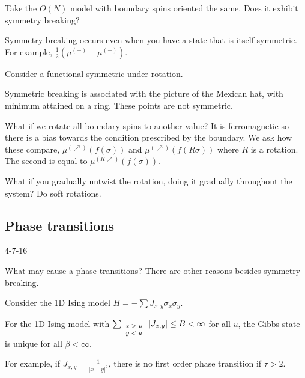 \documentclass[12pt]{book}
\theoremstyle{norm}
\begin{document}
Take the $O(N)$ model with boundary spins oriented the same. Does it exhibit symmetry breaking? %

Symmetry breaking occurs even when you have a state that is itself symmetric. For example, $\frac{1}{2} (\mu^{(+)} + \mu^{(-)})$. 

Consider a functional symmetric under rotation. 

Symmetric breaking is associated with the picture of the Mexican hat, with minimum attained on a ring. These points are not symmetric. 


What if we rotate all boundary spins to another value? It is ferromagnetic so there is a bias towards the condition prescribed by the boundary. %
We ask how these compare, $\mu^{(\nearrow)} (f(\sigma))$ and $\mu^{(\nearrow)} (f(R\sigma))$ where $R$ is a rotation. The second is equal to $\mu^{(R\nearrow)}(f(\sigma))$. 

What if you gradually untwist the rotation, doing it gradually throughout the system? Do soft rotations.

\subsection{Phase transitions}

{\color{blue}4-7-16}




What may cause a phase transitions? There are other reasons besides symmetry breaking.

Consider the 1D Ising model $H=-\sum J_{x,y} \sigma_x\sigma_y$. 

\begin{theorem}
For the 1D Ising model with $\sum_{\scriptsize \begin{array}{c}{x\ge u}\\{y<u}\end{array}}|J_{x,y}|\le B<\infty$ for all $u$, the Gibbs state is unique for all $\beta<\infty$.
\end{theorem}
For example, if $J_{x,y} = \frac{1}{|x-y|^2}$, there is no first order phase transition if $\tau>2$.
\end{document}
